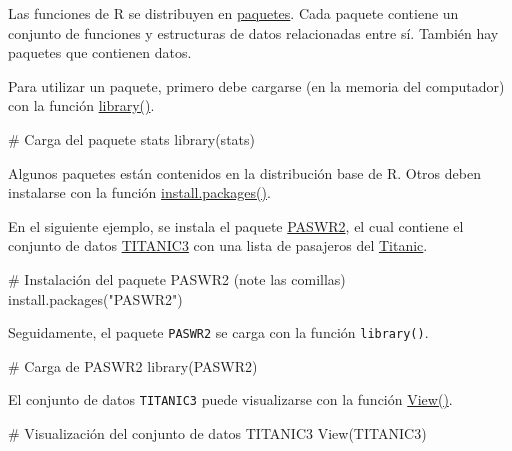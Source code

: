 \documentclass[
  letterpaper,
  DIV=11,
  numbers=noendperiod]{scrreprt}
\newenvironment{Shaded}{\begin{snugshade}}{\end{snugshade}}
\newcommand{\CommentTok}[1]{\textcolor[rgb]{0.37,0.37,0.37}{#1}}
\newcommand{\FunctionTok}[1]{\textcolor[rgb]{0.28,0.35,0.67}{#1}}
\newcommand{\NormalTok}[1]{\textcolor[rgb]{0.00,0.23,0.31}{#1}}
\newcommand{\StringTok}[1]{\textcolor[rgb]{0.13,0.47,0.30}{#1}}
\begin{document}
Las funciones de R se distribuyen en
\href{https://en.wikipedia.org/wiki/R_package}{paquetes}. Cada paquete
contiene un conjunto de funciones y estructuras de datos relacionadas
entre sí. También hay paquetes que contienen datos.

Para utilizar un paquete, primero debe cargarse (en la memoria del
computador) con la función
\href{https://rdrr.io/r/base/library.html}{library()}.

\begin{Shaded}
\begin{Highlighting}[]
\CommentTok{\# Carga del paquete stats}
\FunctionTok{library}\NormalTok{(stats)}
\end{Highlighting}
\end{Shaded}

Algunos paquetes están contenidos en la distribución base de R. Otros
deben instalarse con la función
\href{https://rdrr.io/r/utils/install.packages.html}{install.packages()}.

En el siguiente ejemplo, se instala el paquete
\href{https://cran.r-project.org/package=PASWR2}{PASWR2}, el cual
contiene el conjunto de datos
\href{https://rdrr.io/cran/PASWR2/man/TITANIC3.html}{TITANIC3} con una
lista de pasajeros del
\href{https://es.wikipedia.org/wiki/RMS_Titanic}{Titanic}.

\begin{Shaded}
\begin{Highlighting}[]
\CommentTok{\# Instalación del paquete PASWR2 (note las comillas)}
\FunctionTok{install.packages}\NormalTok{(}\StringTok{"PASWR2"}\NormalTok{)}
\end{Highlighting}
\end{Shaded}

Seguidamente, el paquete \texttt{PASWR2} se carga con la función
\texttt{library()}.

\begin{Shaded}
\begin{Highlighting}[]
\CommentTok{\# Carga de PASWR2}
\FunctionTok{library}\NormalTok{(PASWR2)}
\end{Highlighting}
\end{Shaded}

El conjunto de datos \texttt{TITANIC3} puede visualizarse con la función
\href{https://rdrr.io/r/utils/View.html}{View()}.

\begin{Shaded}
\begin{Highlighting}[]
\CommentTok{\# Visualización del conjunto de datos TITANIC3}
\FunctionTok{View}\NormalTok{(TITANIC3)}
\end{Highlighting}
\end{Shaded}
\end{document}
